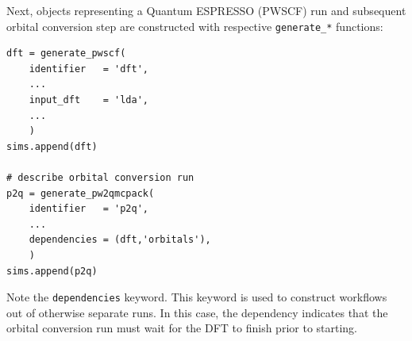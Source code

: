 Next, objects representing a Quantum ESPRESSO (PWSCF) run and subsequent orbital conversion step are constructed with respective \texttt{generate\_*} functions:
\begin{lstlisting}
dft = generate_pwscf(
    identifier   = 'dft',
    ...
    input_dft    = 'lda',
    ...
    )
sims.append(dft)

# describe orbital conversion run                                                                    
p2q = generate_pw2qmcpack(
    identifier   = 'p2q',
    ...
    dependencies = (dft,'orbitals'),
    )
sims.append(p2q)
\end{lstlisting}
Note the \texttt{dependencies} keyword.  This keyword is used to construct workflows out of otherwise separate runs.  In this case, the dependency indicates that the orbital conversion run must wait for the DFT to finish prior to starting.


